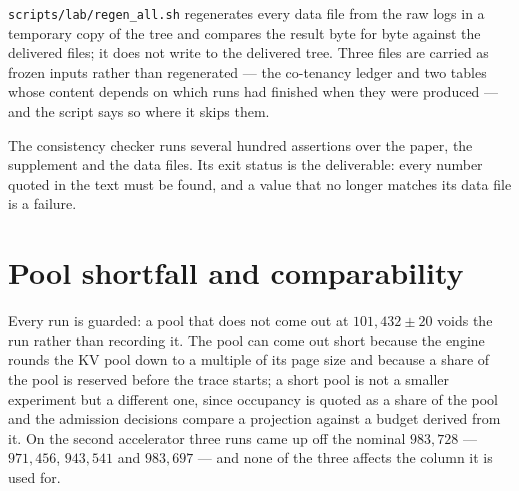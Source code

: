\documentclass[10pt]{article}
\begin{document}
\texttt{scripts/lab/regen\_all.sh} regenerates every data file from the raw logs
in a temporary copy of the tree and compares the result byte for byte against the
delivered files; it does not write to the delivered tree. Three files are carried
as frozen inputs rather than regenerated --- the co-tenancy ledger and two tables
whose content depends on which runs had finished when they were produced --- and
the script says so where it skips them.

The consistency checker runs several hundred assertions over the paper, the supplement and
the data files. Its exit status is the deliverable: every number quoted in the
text must be found, and a value that no longer matches its data file is a
failure.


\section{Pool shortfall and comparability}

Every run is guarded: a pool that does not come out at $101{,}432\pm20$ voids the
run rather than recording it. The pool can come out short because the engine
rounds the KV pool down to a multiple of its page size and because a share of the
pool is reserved before the trace starts; a short pool is not a smaller
experiment but a different one, since occupancy is quoted as a share of the pool
and the admission decisions compare a projection against a budget derived from
it. On the second accelerator three runs came up off the nominal $983{,}728$ ---
$971{,}456$, $943{,}541$ and $983{,}697$ --- and none of the three affects the
column it is used for.
\end{document}
